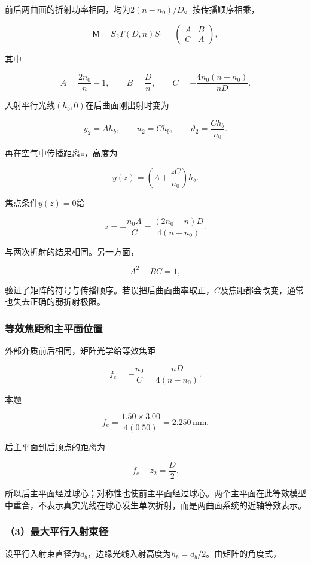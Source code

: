 \documentclass[12pt,a4paper,fontset=fandol]{ctexart}
\begin{document}
前后两曲面的折射功率相同，均为\(2(n-n_0)/D\)。按传播顺序相乘，

\[
\mathsf M=S_2T(D,n)S_1
=\begin{pmatrix}A&B\\C&A\end{pmatrix},
\]

其中

\[
A=\frac{2n_0}{n}-1,\qquad
B=\frac Dn,\qquad
C=-\frac{4n_0(n-n_0)}{nD}.
\]

入射平行光线\((h_b,0)\)在后曲面刚出射时变为

\[
y_2=Ah_b,\qquad
u_2=Ch_b,\qquad
\vartheta_2=\frac{Ch_b}{n_0}.
\]

再在空气中传播距离\(z\)，高度为

\[
y(z)=\left(A+\frac{zC}{n_0}\right)h_b.
\]

焦点条件\(y(z)=0\)给

\[
z=-\frac{n_0A}{C}
=\frac{(2n_0-n)D}{4(n-n_0)}.
\]

与两次折射的结果相同。另一方面，

\[
A^2-BC=1,
\]

验证了矩阵的符号与传播顺序。若误把后曲面曲率取正，\(C\)及焦距都会改变，通常也失去正确的弱折射极限。

\subsubsection{等效焦距和主平面位置}\label{ux7b49ux6548ux7126ux8dddux548cux4e3bux5e73ux9762ux4f4dux7f6e}

外部介质前后相同，矩阵光学给等效焦距

\[
\boxed{
f_e=-\frac{n_0}{C}
=\frac{nD}{4(n-n_0)}}.
\]

本题

\[
f_e=\frac{1.50\times3.00}{4(0.50)}
=2.250\,\mathrm{mm}.
\]

后主平面到后顶点的距离为

\[
f_e-z_2=\frac D2.
\]

所以后主平面经过球心；对称性也使前主平面经过球心。两个主平面在此等效模型中重合，不表示真实光线在球心发生单次折射，而是两曲面系统的近轴等效表示。

\subsubsection{（3）最大平行入射束径}\label{ux6700ux5927ux5e73ux884cux5165ux5c04ux675fux5f84}

设平行入射束直径为\(d_b\)，边缘光线入射高度为\(h_b=d_b/2\)。由矩阵的角度式，
\end{document}
